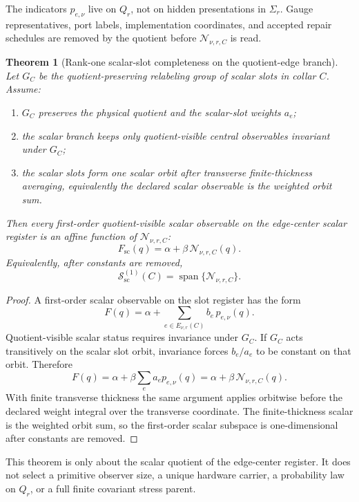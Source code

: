 \documentclass[11pt]{article}
\newtheorem{theorem}{Theorem}[section]
\theoremstyle{remark}
\theoremstyle{plain}
\begin{document}
The indicators \(p_{e,\nu}\) live on \(Q_r\), not on hidden presentations in
\(\Sigma_r\). Gauge representatives, port labels, implementation coordinates,
and accepted repair schedules are removed by the quotient before
\(\mathcal N_{\nu,r,C}\) is read.

\begin{theorem}[Rank-one scalar-slot completeness on the quotient-edge branch]
\label{thm:scalar-slot-completeness}
Let \(G_C\) be the quotient-preserving relabeling group of scalar slots in
collar \(C\). Assume:
\begin{enumerate}[leftmargin=2em,label=(\roman*)]
\item \(G_C\) preserves the physical quotient and the scalar-slot weights
\(a_e\);
\item the scalar branch keeps only quotient-visible central observables
invariant under \(G_C\);
\item the scalar slots form one scalar orbit after transverse finite-thickness
averaging, equivalently the declared scalar observable is the weighted orbit sum.
\end{enumerate}
Then every first-order quotient-visible scalar observable on the edge-center
scalar register is an affine function of \(\mathcal N_{\nu,r,C}\):
\[
F_{\mathrm{sc}}(q)=\alpha+\beta\,\mathcal N_{\nu,r,C}(q).
\]
Equivalently, after constants are removed,
\[
\mathcal S^{(1)}_{\mathrm{sc}}(C)
=
\operatorname{span}\{\mathcal N_{\nu,r,C}\}.
\]
\end{theorem}

\begin{proof}
A first-order scalar observable on the slot register has the form
\[
F(q)=\alpha+\sum_{e\in E_{\nu,r}(C)}b_e\,p_{e,\nu}(q).
\]
Quotient-visible scalar status requires invariance under \(G_C\). If \(G_C\)
acts transitively on the scalar slot orbit, invariance forces \(b_e/a_e\) to be
constant on that orbit. Therefore
\[
F(q)
=
\alpha+\beta\sum_e a_ep_{e,\nu}(q)
=
\alpha+\beta\,\mathcal N_{\nu,r,C}(q).
\]
With finite transverse thickness the same argument applies orbitwise before the
declared weight integral over the transverse coordinate. The finite-thickness
scalar is the weighted orbit sum, so the first-order scalar subspace is
one-dimensional after constants are removed.
\end{proof}

This theorem is only about the scalar quotient of the edge-center register. It
does not select a primitive observer size, a unique hardware carrier, a
probability law on \(Q_r\), or a full finite covariant stress parent.
\end{document}
